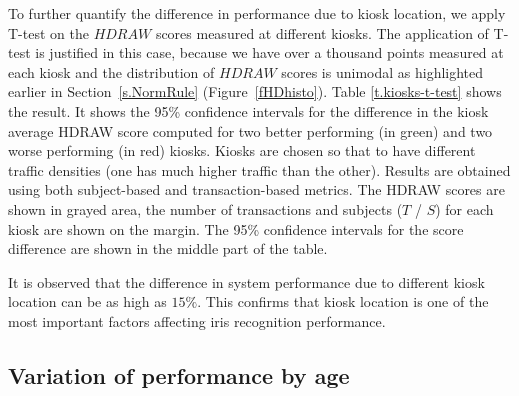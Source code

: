 \documentclass{cta-author}%
\begin{document}
    
To  further quantify the difference in performance due to kiosk location, we apply T-test \cite{R-book} on the $HDRAW$ scores measured at different kiosks. The application of T-test is justified in this case, because we have over a thousand points measured at  each kiosk and the distribution of $HDRAW$ scores is unimodal as highlighted earlier in Section~\ref{s.NormRule} (Figure~\ref{fHDhisto}).
Table \ref{t.kiosks-t-test} shows the result. 
It shows 
the 95\% confidence intervals for the difference  in the kiosk average HDRAW score 
computed for 
two better performing (in green) and two worse performing (in red) kiosks. Kiosks are chosen so that to have different traffic densities (one has much higher traffic than the other). 
Results are obtained 
using both subject-based and transaction-based  metrics.
The HDRAW scores are shown in grayed area, the number of  transactions  and  subjects ($T$ / $S$) for each kiosk are shown on the margin. %
The  95\% confidence intervals for the score difference are shown in the middle part of  the table. 




It is observed that the difference in system performance due to different kiosk location can be as high as  $15\%$.
This confirms that kiosk location is one of the most important factors affecting iris recognition performance.



\subsection{Variation of performance by age}

\end{document}
